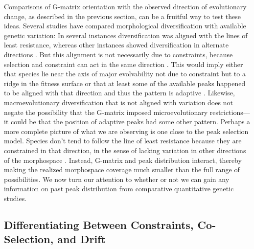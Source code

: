 \begin{refsection}
Comparisons of G-matrix orientation with the observed direction of
evolutionary change, as described in the previous section, can be a
fruitful way to test these ideas. Several studies have compared
morphological diversification with available genetic variation: In
several instances diversification was aligned with the lines of least
resistance, whereas other instances showed diversification in alternate
directions \parencite{Berner2010-dp, Marroig2010-be, Renaud2006-ds, Schluter1996-gw}. 
But this alignment is
not necessarily due to constraints, because selection and constraint can
act in the same direction \parencite{Conner2012-ru, Marroig2010-be}. This would imply either that species
lie near the axis of major evolvability not due to constraint but to a
ridge in the fitness surface \parencite{Conner2012-ru} or that at least 
some of the available peaks happened to be
aligned with that direction and thus the pattern is adaptive \parencite{Arnold2001-lz, Marroig2010-be}. Likewise, macroevolutionary diversification that is not aligned with variation
does not negate the possibility that the G-matrix imposed
microevolutionary restrictions---it could be that the position of
adaptive peaks had some other pattern. Perhaps a more complete picture
of what we are observing is one close to the peak selection model.
Species don't tend to follow the line of least resistance because they
are constrained in that direction, in the sense of lacking variation in
other directions of the morphospace \parencite{Marroig2005-ce, Marroig2010-be}. 
Instead, G-matrix and peak
distribution interact, thereby making the realized morphospace coverage
much smaller than the full range of possibilities. We now turn our
attention to whether or not we can gain any information on past peak
distribution from comparative quantitative genetic studies.

\subsection{Differentiating Between Constraints, Co-Selection, and Drift}


\end{refsection}
